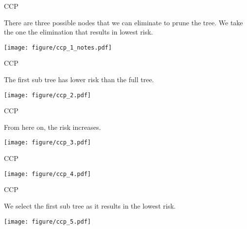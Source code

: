\documentclass[11pt,compress,t,notes=noshow, xcolor=table]{beamer}
\begin{document}
\begin{frame}[noframenumbering]{CCP}

There are three possible nodes that we can eliminate to prune the tree.
We take the one the elimination that results in lowest risk.

\vspace{0.25cm}

\color{fgcolor}

{\centering \texttt{[image: figure/ccp\_1\_notes.pdf]} 

}

\end{frame}

\begin{frame}[noframenumbering]{CCP}

The first sub tree has lower risk than the full tree.
\vspace{0.25cm}

{\centering \texttt{[image: figure/ccp\_2.pdf]} 

}

\end{frame}

\begin{frame}[noframenumbering]{CCP}

From here on, the risk increases.
\vspace{0.25cm}


{\centering \texttt{[image: figure/ccp\_3.pdf]} 

}

\end{frame}

\begin{frame}[noframenumbering]{CCP}


{\centering \texttt{[image: figure/ccp\_4.pdf]} 

}


\end{frame}

\begin{frame}[noframenumbering]{CCP}

We select the first sub tree as it results in the lowest risk.
\vspace{0.25cm}


{\centering \texttt{[image: figure/ccp\_5.pdf]} 

}


\end{frame}



\endlecture
\end{document}
